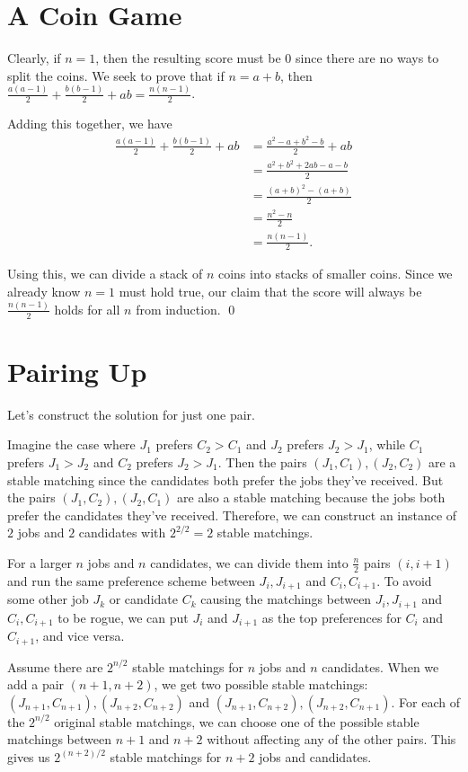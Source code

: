 \documentclass{article}
\begin{document}
\section{A Coin Game}
Clearly, if $n = 1$, then the resulting score must be 0 since there are no ways 
to split the coins. We seek to prove that if $n = a+b$, then $\frac{a(a-1)}{2} + \frac{b(b-1)}{2} + ab =
\frac{n(n-1)}{2}$. 

Adding this together, we have
\begin{align*}
	\frac{a(a-1)}{2} + \frac{b(b-1)}{2} + ab &= \frac{a^2-a + b^2-b}{2} + ab \\
	&= \frac{a^2 + b^2 + 2ab - a - b}{2} \\
	&= \frac{(a+b)^2 - (a+b)}{2} \\
	&= \frac{n^2 - n}{2} \\
	&= \frac{n(n-1)}{2}.
\end{align*}

Using this, we can divide a stack of $n$ coins into stacks of smaller coins. Since 
we already know $n=1$ must hold true, our claim that the score will always be 
$\frac{n(n-1)}{2}$ holds for all $n$ from induction. \qed

\section{Pairing Up}

Let's construct the solution for just one pair. 

Imagine the case where $J_1$ prefers $C_2 > C_1$ and $J_2$ prefers 
$J_2 > J_1$, while $C_1$ prefers $J_1 > J_2$ and $C_2$ prefers $J_2 > J_1$. 
Then the pairs $(J_1, C_1), (J_2, C_2)$ are a stable matching since the candidates 
both prefer the jobs they've received. But the pairs $(J_1, C_2), (J_2, C_1)$ are 
also a stable matching because the jobs both prefer the candidates they've received. 
Therefore, we can construct an instance of $2$ jobs and $2$ candidates 
with $2^{2/2} = 2$ stable matchings.

For a larger $n$ jobs and $n$ candidates, we can divide them into $\frac{n}{2}$ pairs $(i, i+1)$ 
and run the same preference scheme between $J_i, J_{i+1}$ and $C_i, C_{i+1}$. To avoid 
some other job $J_k$ or candidate $C_k$ causing the matchings between $J_i, J_{i+1}$ and 
$C_i, C_{i+1}$ to be rogue, we can put $J_i$ and $J_{i+1}$ as the top preferences 
for $C_i$ and $C_{i+1}$, and vice versa.

Assume there are $2^{n/2}$ stable matchings for $n$ jobs and $n$ candidates.
When we add a pair $(n+1, n+2)$, we get two possible stable matchings: $(J_{n+1}, C_{n+1}),
(J_{n+2}, C_{n+2})$ and $(J_{n+1}, C_{n+2}), (J_{n+2}, C_{n+1})$. For each of the
$2^{n/2}$ original stable matchings, we can choose one of the possible stable matchings 
between $n+1$ and $n+2$ without affecting any of the other pairs. This gives us 
$2^{(n+2)/2}$ stable matchings for $n+2$ jobs and candidates.
\end{document}
